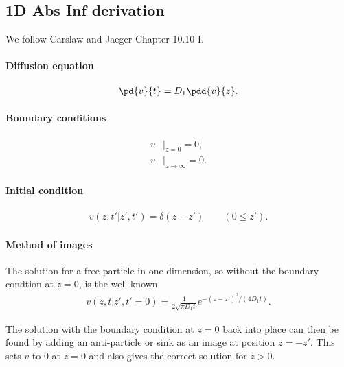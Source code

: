 \subsection{1D Abs Inf derivation}

We follow Carslaw and Jaeger Chapter 10.10 I.


\paragraph{Diffusion equation}
\begin{align}
  \pd{v}{t} = D_1 \pdd{v}{z}.
\end{align}


\paragraph{Boundary conditions}
\begin{align}
  v &|_{z=0} = 0,\\
  v &|_{z\to\infty} = 0.
\end{align}


\paragraph{Initial condition}
\begin{align}
  v(z,t'|z',t') = \delta(z-z') \qquad (0 \leq z').
\end{align}


\paragraph{Method of images}
The solution for a free particle in one dimension, so without the boundary 
condtion at $z=0$, is the well known
\begin{align}
  v(z,t|z',t'=0) = \frac{1}{2\sqrt{\pi D_1t}} e^{-(z-z')^2/(4 D_1 t)}.
\end{align}

The solution with the boundary condition at $z=0$ back into place can then be 
found by adding an anti-particle or sink as an image at position $z=-z'$.  
This sets $v$ to $0$ at $z=0$ and also gives the correct solution for $z>0$.
